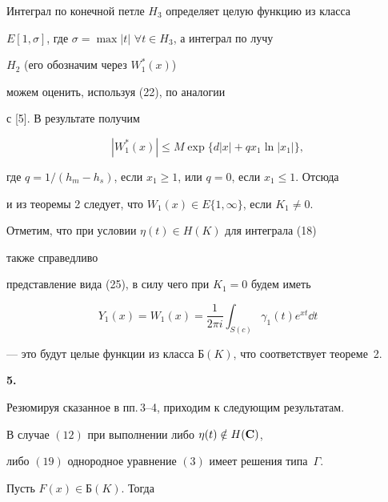 {Интеграл по конечной петле $H_3$ определяет целую функцию из класса


$E[1,\sigma]$, где $\sigma=\max|t|$ $\forall t\in H_3$, а интеграл по лучу


$H_2$ (его обозначим через $W_1^*(x)$)


можем оценить, используя (22), по аналогии


с [5]. В результате получим


$$


|W_1^*(x)|\le M\exp\{ d|x|+qx_1\ln|x_1|\},


$$


где $q=1/(h_m-h_s)$, если $x_1\ge 1$, или $q=0$, если $x_1\le 1$. Отсюда


и из теоремы 2 следует, что  $W_1(x)\in E\{ 1,\infty \}$, если $K_1\ne 0$.





Отметим, что при условии $\eta(t)\in H(K)$ для интеграла (18)


также справедливо


представление вида (25), в силу чего при $K_1=0$ будем иметь


$$


Y_1(x)=W_1(x)=\frac{1}{2\pi i}\int_{S(c)}\gamma_1(t)e^{xt} \dd t


$$


--- это будут целые функции из класса $Б(K)$, что соответствует теореме~2.


\medskip





{\bf 5.}


Резюмируя сказанное в пп.\,3--4, приходим к следующим результатам.





\begin{thm}


В случае $(12)$ при выполнении либо $\eta(t)\notin H(\bold C)$,


либо $(19)$ однородное уравнение $(3)$ имеет решения типа~$\Gamma$.


\end{thm}





\begin{thm}


Пусть $F(x)\in Б(K)$. Тогда


\begin{itemize}



\end{itemize}
\end{thm}}

